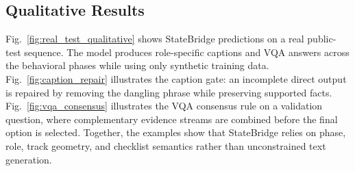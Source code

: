 \documentclass[runningheads]{llncs}
\begin{document}
\begin{table}[h!]
\centering
\caption{Ablation submissions for VQA consensus and caption fusion. Higher is better for all metrics.}
\label{tab:ablations}
\small
{}
\end{table}

\subsection{Qualitative Results}

Fig.~\ref{fig:real_test_qualitative} shows StateBridge predictions on a real public-test sequence. The model produces role-specific captions and VQA answers across the behavioral phases while using only synthetic training data. Fig.~\ref{fig:caption_repair} illustrates the caption gate: an incomplete direct output is repaired by removing the dangling phrase while preserving supported facts. Fig.~\ref{fig:vqa_consensus} illustrates the VQA consensus rule on a validation question, where complementary evidence streams are combined before the final option is selected. Together, the examples show that StateBridge relies on phase, role, track geometry, and checklist semantics rather than unconstrained text generation.
\end{document}
